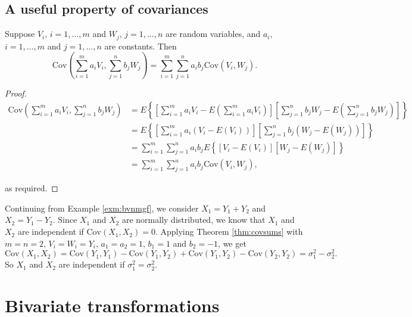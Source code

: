\documentclass[]{book}
\theoremstyle{definition}
\theoremstyle{definition}
\theoremstyle{definition}
\theoremstyle{remark}
\let\BeginKnitrBlock\begin \let\EndKnitrBlock\end
\begin{document}
\section{A useful property of
covariances}\label{a-useful-property-of-covariances}

\BeginKnitrBlock{theorem}
\protect\hypertarget{thm:covsums}{}{\label{thm:covsums} }Suppose \(V_i\),
\(i = 1,\ldots, m\) and \(W_j\), \(j = 1, \ldots, n\) are random
variables, and \(a_i\), \(i = 1, \ldots, m\) and \(j = 1, \ldots, n\)
are constants. Then
\[\text{Cov}\left(\sum_{i=1}^m a_i V_i, \sum_{j=1}^n b_j W_j \right)
= \sum_{i=1}^m \sum_{j=1}^n a_i b_j \text{Cov}(V_i, W_j).\]
\EndKnitrBlock{theorem}

\BeginKnitrBlock{proof}
\iffalse{} {Proof. } \fi{}

\begin{align*}
\text{Cov}\left(\sum_{i=1}^m a_i V_i, \sum_{j=1}^n b_j W_j \right)
&= E \left\{\left[ \sum_{i=1}^m a_i V_i - E\left(\sum_{i=1}^m a_i V_i\right) \right] \left[ \sum_{j=1}^n b_j W_j - E\left(\sum_{j=1}^n b_j W_j\right) \right] \right\} \\
&= E \left\{\left[ \sum_{i=1}^m a_i \left(V_i -  E(V_i)\right)\right] \left[ \sum_{j=1}^n b_j \left(W_j - E(W_j)\right) \right] \right\} \\
&= \sum_{i=1}^m \sum_{j=1}^n a_i b_j E\left\{\left[V_i - E(V_i)\right]\left[W_j - E(W_j)\right] \right\} \\
&= \sum_{i=1}^m \sum_{j=1}^n a_i b_j \text{Cov}(V_i, W_j),
\end{align*}

as required.
\EndKnitrBlock{proof}

\BeginKnitrBlock{example}
\protect\hypertarget{exm:unnamed-chunk-72}{}{\label{exm:unnamed-chunk-72}
}Continuing from Example \ref{exm:bvnmgf}, we consider
\(X_1 = Y_1 + Y_2\) and \(X_2 = Y_1 - Y_2\). Since \(X_1\) and \(X_2\)
are normally distributed, we know that \(X_1\) and \(X_2\) are
independent if \(\text{Cov}(X_1, X_2) = 0\). Applying Theorem
\ref{thm:covsums} with \(m = n = 2\), \(V_i = W_i = Y_i\),
\(a_1 = a_2 = 1\), \(b_1 = 1\) and \(b_2 = -1\), we get
\[\text{Cov}(X_1, X_2) = \text{Cov}(Y_1, Y_1) - \text{Cov}(Y_1, Y_2) + \text{Cov}(Y_1, Y_2) - \text{Cov}(Y_2, Y_2) = \sigma_1^2 - \sigma_2^2.\]
So \(X_1\) and \(X_2\) are independent if \(\sigma_1^2 = \sigma_2^2\).
\EndKnitrBlock{example}

\chapter{Bivariate transformations}\label{bivariate-transformations}
\end{document}
